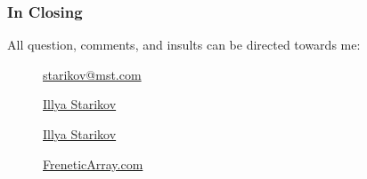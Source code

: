 \documentclass[xclolor=dvipsnames]{beamer}            %
\begin{document}
\begin{darkframes}
    \begin{frame}
        \frametitle{In Closing}

        All question, comments, and insults can be directed towards me:

        \begin{center}
            \begin{description}
                \item[\faComment] \href{mailto:starikov@mst.edu}{starikov@mst.com}
                \item[\faLinkedin] \href{https://www.linkedin.com/in/illyastarikov/}{Illya Starikov}
                \item[\faGithub] \href{https://github.com/IllyaStarikov/}{Illya Starikov}
                \item[\faRss] \href{https://freneticarray.com/}{FreneticArray.com}
            \end{description}
        \end{center}
    \end{frame}
\end{darkframes}
\end{document}
